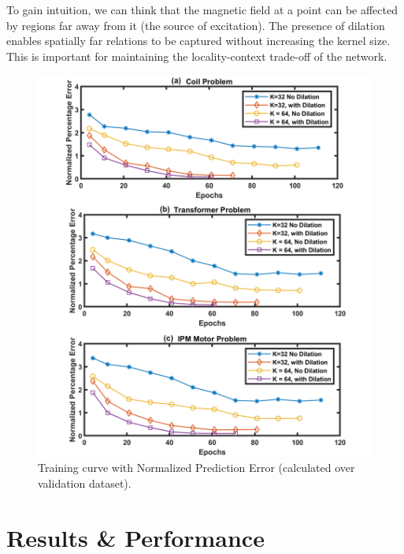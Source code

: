 To gain intuition, we can think that the magnetic field at a point can be affected by regions far away from it (the source of excitation). The presence of dilation enables spatially far relations to be captured without increasing the kernel size. This is important for maintaining the locality-context trade-off of the network.

\begin{figure}[h!]
    \centering
    \includegraphics[width=\textwidth]{Figures/Chp2_CNN/Training_results3.png}
    \caption{Training curve with Normalized Prediction Error (calculated over validation dataset).}
    \label{fig:cnn_training_results}
\end{figure}

\section{Results \& Performance} \label{sec:results_CNN}

